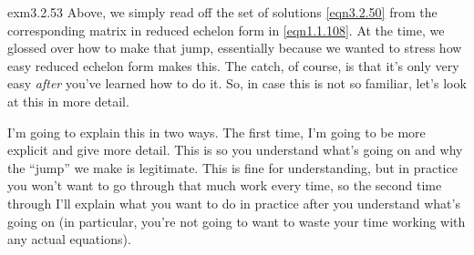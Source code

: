 \begin{exm}{}{exm3.2.53}
	Above, we simply read off the set of solutions \eqref{eqn3.2.50} from the corresponding matrix in reduced echelon form in \eqref{eqn1.1.108}.  At the time, we glossed over how to make that jump, essentially because we wanted to stress how easy reduced echelon form makes this.  The catch, of course, is that it's only very easy \emph{after} you've learned how to do it.  So, in case this is not so familiar, let's look at this in more detail.
	
	I'm going to explain this in two ways.  The first time, I'm going to be more explicit and give more detail.  This is so you understand what's going on and why the ``jump'' we make is legitimate.  This is fine for understanding, but in practice you won't want to go through that much work every time, so the second time through I'll explain what you want to do in practice after you understand what's going on (in particular, you're not going to want to waste your time working with any actual equations).
	

\end{exm}
